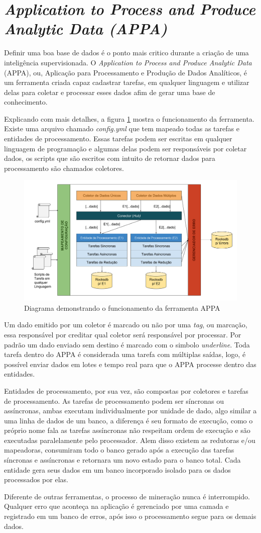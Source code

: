 \section{\textit{Application to Process and Produce Analytic Data (APPA)}}

Definir uma boa base de dados é o ponto mais critico durante a criação de uma inteligência supervisionada. O \textit{Application to Process and Produce Analytic Data} (APPA), ou, Aplicação para Processamento e Produção de Dados Analíticos, é um ferramenta criada capaz cadastrar tarefas, em qualquer linguagem e utilizar delas para coletar e processar esses dados afim de gerar uma base de conhecimento.

Explicando com mais detalhes, a figura \ref{fig:appa_eng} mostra o funcionamento da ferramenta. Existe uma arquivo chamado \textit{config.yml} que tem mapeado todas as tarefas e entidades de processamento. Essas tarefas podem ser escritas em qualquer linguagem de programação e algumas delas podem ser responsáveis por coletar dados, os scripts que são escritos com intuito de retornar dados para processamento são chamados coletores.

\begin{figure}
    \centering
    \includegraphics[width=.8\textwidth]{imagens/appa_eng.png}
    \caption{Diagrama demonstrando o funcionamento da ferramenta APPA}
    \label{fig:appa_eng}
\end{figure}

Um dado emitido por um coletor é marcado ou não por uma \textit{tag}, ou marcação, essa responsável por creditar qual coletor será responsável por processar. Por padrão um dado enviado sem destino é marcado com o simbolo \textit{underline}. Toda tarefa dentro do APPA é considerada uma tarefa com múltiplas saídas, logo, é possível enviar dados em lotes e tempo real para que o APPA processe dentro das entidades. 

Entidades de processamento, por sua vez, são compostas por coletores e tarefas de processamento. As tarefas de processamento podem ser síncronas ou assíncronas, ambas executam individualmente por unidade de dado, algo similar a uma linha de dados de um banco, a diferença é seu formato de execução, como o próprio nome fala as tarefas assíncronas não respeitam ordem de execução e são executadas paralelamente pelo processador. Alem disso existem as redutoras e/ou mapeadoras, consumiram todo o banco gerado após a execução das tarefas síncronas e assíncronas e retornara um novo estado para o banco total. Cada entidade gera seus dados em um banco incorporado isolado para os dados processados por elas.

Diferente de outras ferramentas, o processo de mineração nunca é interrompido. Qualquer erro que aconteça na aplicação é gerenciado por uma camada e registrado em um banco de erros, após isso o processamento segue para os demais dados.
